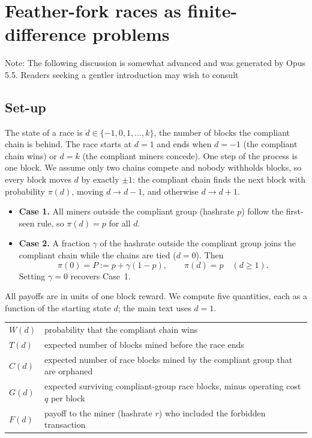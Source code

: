 \documentclass{article}%
\begin{document}
\section{Feather-fork races as finite-difference problems\label{app:race}}


Note: The following discussion is somewhat advanced and was generated by Opus 5.5. Readers seeking a gentler introduction may wish to consult \cite[Chapters 5--6]{Warren23}

\subsection{Set-up}

The state of a race is $d\in\{-1,0,1,\dots,k\}$, the number of blocks the
compliant chain is behind. The race starts at $d=1$ and ends when $d=-1$ (the
compliant chain wins) or $d=k$ (the compliant miners concede). One step of the
process is one block. We assume only two chains compete and nobody withholds
blocks, so every block moves $d$ by exactly $\pm1$: the compliant chain finds
the next block with probability $\pi(d)$, moving $d\to d-1$, and otherwise
$d\to d+1$.

\begin{itemize}
\item \textbf{Case 1.} All miners outside the compliant group (hashrate $p$)
follow the first-seen rule, so $\pi(d)=p$ for all $d$.

\item \textbf{Case 2.} A fraction $\gamma$ of the hashrate outside the
compliant group joins the compliant chain while the chains are tied ($d=0$).
Then
\[
\pi(0)=P:=p+\gamma(1-p),\qquad\pi(d)=p\quad(d\geq1).
\]
Setting $\gamma=0$ recovers Case~1.
\end{itemize}

All payoffs are in units of one block reward. We compute five quantities,
each as a function of the starting state $d$; the main text uses $d=1$.

\begin{center}%
\begin{tabular}
[c]{lp{}}%
$W(d)$ & probability that the compliant chain wins\\
$T(d)$ & expected number of blocks mined before the race ends\\
$C(d)$ & expected number of race blocks mined by the compliant group that are
orphaned\\
$G(d)$ & expected surviving compliant-group race blocks, minus operating cost
$q$ per block\\
$F(d)$ & payoff to the miner (hashrate $r$) who included the forbidden
transaction
\end{tabular}
\end{center}
\end{document}
